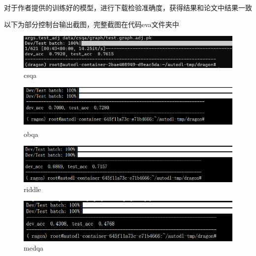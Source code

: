 对于作者提供的训练好的模型，进行下载检验准确度，获得结果和论文中结果一致

以下为部分控制台输出截图，完整截图在代码eva文件夹中
\begin{figure}[H]
  \centering
  \includegraphics[width=\textwidth]{figure/csqa1.png}
  \caption{csqa}
  \label{fig:my_label}
\end{figure}
\begin{figure}[H]
  \centering
  \includegraphics[width=\textwidth]{figure/obqa1.png}
  \caption{obqa}
  \label{fig:my_label}
\end{figure}
\begin{figure}[H]
  \centering
  \includegraphics[width=\textwidth]{figure/riddle1.png}
  \caption{riddle}
  \label{fig:my_label}
\end{figure}
\begin{figure}[H]
  \centering
  \includegraphics[width=\textwidth]{figure/medqa1.png}
  \caption{medqa}
  \label{fig:my_label}
\end{figure}